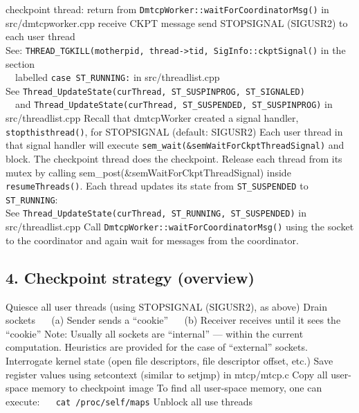 \documentclass{article}
\begin{document}
\begin{algorithmic}[1]
\STATE checkpoint thread:
\STATE   return from {\tt DmtcpWorker::waitForCoordinatorMsg()}
	   in src/dmtcpworker.cpp
\STATE   receive CKPT message
\STATE   send STOPSIGNAL (SIGUSR2) to each user thread \\
  See:  {\tt THREAD\_TGKILL(motherpid, thread->tid, SigInfo::ckptSignal()}
                in the section \\
                ~~labelled {\tt case~ST\_RUNNING:} in src/threadlist.cpp \\
  See {\tt Thread\_UpdateState(curThread, ST\_SUSPINPROG, ST\_SIGNALED)} \\
  ~~and {\tt Thread\_UpdateState(curThread, ST\_SUSPENDED, ST\_SUSPINPROG)}
	in src/threadlist.cpp
\STATE   Recall that dmtcpWorker created a signal handler,
            {\tt stopthisthread()}, for STOPSIGNAL (default: SIGUSR2)
\STATE   Each user thread in that signal handler will
           execute {\tt sem\_wait(\&semWaitForCkptThreadSignal)} and block.
\STATE   The checkpoint thread does the checkpoint.
\newline
\STATE   Release each thread from its mutex
           by calling {sem\_post(\&semWaitForCkptThreadSignal)}
           inside {\tt resumeThreads()}.
\STATE  Each thread updates its state from {\tt ST\_SUSPENDED}
           to {\tt ST\_RUNNING}: \\
       See {\tt Thread\_UpdateState(curThread, ST\_RUNNING, ST\_SUSPENDED)}
	in src/threadlist.cpp
\STATE  Call {\tt DmtcpWorker::waitForCoordinatorMsg()} using the socket
          to the coordinator and again wait for
	  messages from the coordinator.
\end{algorithmic}

\subsection*{4. Checkpoint strategy (overview)}

\begin{algorithmic}[1]
\STATE Quiesce all user threads (using STOPSIGNAL (SIGUSR2), as above)
\STATE Drain sockets \newline
  \hbox{\ \ } (a) Sender sends a ``cookie'' \newline
  \hbox{\ \ } (b) Receiver receives until it sees the ``cookie'' \newline
  Note:  Usually all sockets are ``internal'' --- within the current
    computation.  Heuristics are provided for the case of ``external'' sockets.
\STATE Interrogate kernel state (open file descriptors, file descriptor offset, etc.)
\STATE Save register values using setcontext (similar to setjmp) in mtcp/mtcp.c
\STATE Copy all user-space memory to checkpoint image
  To find all user-space memory, one can execute: \newline
  \hbox{\ \ } {\tt cat /proc/self/maps}
\STATE Unblock all use threads
\end{algorithmic}
\end{document}
